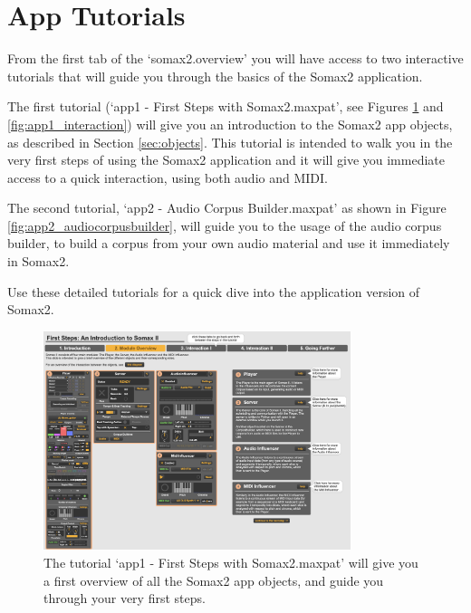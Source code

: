 \section{App Tutorials}

From the first tab of the `somax2.overview' you will have access to two interactive tutorials that will guide you through the basics of the Somax2 application. 

The first tutorial (`app1 - First Steps with Somax2.maxpat', see Figures \ref{fig:app1_overview} and \ref{fig:app1_interaction}) will give you an introduction to the Somax2 app objects, as described in Section \ref{sec:objects}. This tutorial is intended to walk you in the very first steps of using the Somax2 application and it will give you immediate access to a quick interaction, using both audio and MIDI.

The second tutorial, `app2 - Audio Corpus Builder.maxpat' as shown in Figure \ref{fig:app2_audiocorpusbuilder}, will guide you to the usage of the audio corpus builder, to build a corpus from your own audio material and use it immediately in Somax2.

Use these detailed tutorials for a quick dive into the application version of Somax2.

\vspace{30mm}

 \begin{figure}[H]
    \centering        
 	\includegraphics[width=0.8\textwidth]{img/app1_overview.png}
    \caption{The tutorial `app1 - First Steps with Somax2.maxpat' will give you a first overview of all the Somax2 app objects, and guide you through your very first steps.}
    \label{fig:app1_overview}
\end{figure}


